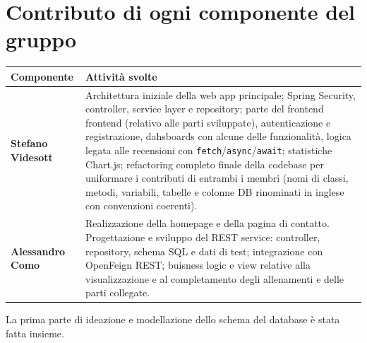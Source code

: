 \section{Contributo di ogni componente del gruppo}

\begin{table}[H]
\centering
\label{tab:contributi}
\renewcommand{\arraystretch}{1.3}
\begin{tabularx}{\linewidth}{l X}
\toprule
\textbf{Componente} & \textbf{Attività svolte} \\
\midrule
\textbf{Stefano Videsott} &
  Architettura iniziale della web app principale; Spring Security,
  controller, service layer e repository; parte del frontend frontend (relativo alle parti sviluppate), autenticazione e registrazione, dahsboards con alcune delle funzionalità, logica legata alle recensioni con
  \texttt{fetch}/\texttt{async}/\texttt{await}; statistiche Chart.js;
  refactoring completo finale della codebase per
  uniformare i contributi di entrambi i membri (nomi di classi,
  metodi, variabili, tabelle e colonne DB rinominati in inglese con
  convenzioni coerenti). \\
\textbf{Alessandro Como} &
  Realizzazione della homepage e della pagina di contatto. Progettazione e sviluppo del REST service: controller, repository,
  schema SQL e dati di test; integrazione con OpenFeign REST;
  buisness logic e view relative alla visualizzazione e al completamento degli allenamenti e delle parti collegate. \\
\bottomrule
\end{tabularx}
\end{table}

La prima parte di ideazione e modellazione dello schema del database è stata fatta insieme.
